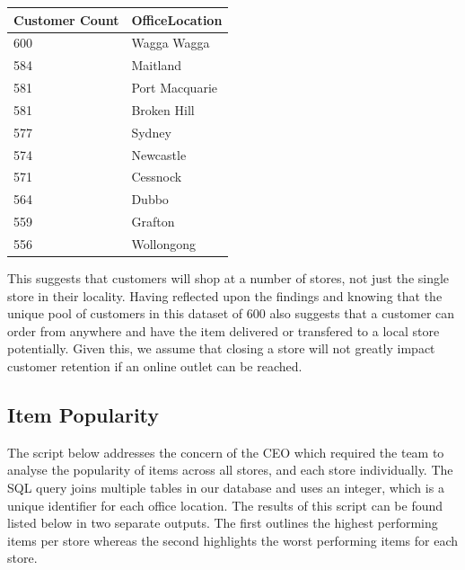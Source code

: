 \documentclass{article}
\begin{document}
            \begin{table}[H]
                \centering
                \begin{tabular}{|l|l|}
                \hline
                Customer Count & OfficeLocation \\ \hline
                600            & Wagga Wagga    \\ \hline
                584            & Maitland       \\ \hline
                581            & Port Macquarie \\ \hline
                581            & Broken Hill    \\ \hline
                577            & Sydney         \\ \hline
                574            & Newcastle      \\ \hline
                571            & Cessnock       \\ \hline
                564            & Dubbo          \\ \hline
                559            & Grafton        \\ \hline
                556            & Wollongong     \\ \hline
                \end{tabular}
            \end{table}


            This suggests that customers will shop at a number of stores, not just the single store in their locality. Having reflected upon the findings and knowing that the unique pool of customers in this dataset of 600 also suggests that a customer can order from anywhere and have the item
            delivered or transfered to a local store potentially. Given this, we assume that closing a store will not greatly impact customer retention if an online outlet can be reached.

\newpage

            \subsection{Item Popularity}
            \label{sec:ItemPopularity}
            
            The script below addresses the concern of the CEO which required the team to analyse the popularity of items across all stores, and each store individually. The SQL query joins multiple tables in our database and uses an integer, which is a unique identifier for each office location. 
            The results of this script can be found listed below in two separate outputs. The first outlines the highest performing items per store whereas the second highlights the worst performing items for each store. \\
\end{document}
